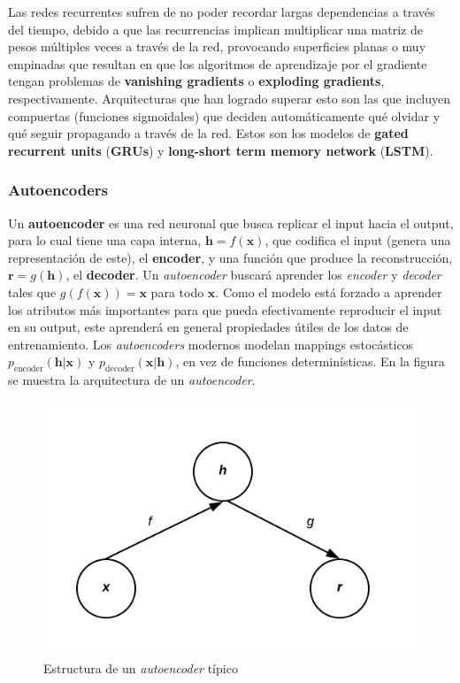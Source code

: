 Las redes recurrentes sufren de no poder recordar largas dependencias a trav\'es del tiempo, debido a que las recurrencias implican multiplicar una matriz de pesos m\'ultiples veces a trav\'es de la red, provocando superficies planas o muy empinadas que resultan en que los algoritmos de aprendizaje por el gradiente tengan problemas de \textbf{vanishing gradients} o \textbf{exploding gradients}, respectivamente. Arquitecturas que han logrado superar esto son las que incluyen compuertas (funciones sigmoidales) que deciden autom\'aticamente qu\'e olvidar y qu\'e seguir propagando a trav\'es de la red. Estos son los modelos de \textbf{gated recurrent units} (\textbf{GRUs}) y \textbf{long-short term memory network} (\textbf{LSTM}).

\subsubsection{Autoencoders}

Un \textbf{autoencoder} es una red neuronal que busca replicar el input hacia el output, para lo cual tiene una capa interna, $\bm{h} = f(\bm{x})$, que codifica el input (genera una representaci\'on de este), el \textbf{encoder}, y una funci\'on que produce la reconstrucci\'on, $\bm{r} = g(\bm{h})$, el \textbf{decoder}. Un \textit{autoencoder} buscar\'a aprender los \textit{encoder} y \textit{decoder} tales que $g(f(\bm{x})) = \bm{x}$ para todo $\bm{x}$. Como el modelo est\'a forzado a aprender los atributos m\'as importantes para que pueda efectivamente reproducir el input en su output, este aprender\'a en general propiedades \'utiles de los datos de entrenamiento. Los \textit{autoencoders} modernos modelan mappings estoc\'asticos $p_{\textrm{encoder}}(\bm{h}|\bm{x})$ y $p_{\textrm{decoder}}(\bm{x}|\bm{h})$, en vez de funciones determin\'isticas. En la figura se muestra la arquitectura de un \textit{autoencoder}.

\begin{figure}[H]
\captionsetup{font=small,labelfont=small}
\caption{Estructura de un \textit{autoencoder} t\'ipico}
\centering
\includegraphics[scale=.8]{img/autoencoder.png}
\end{figure}

